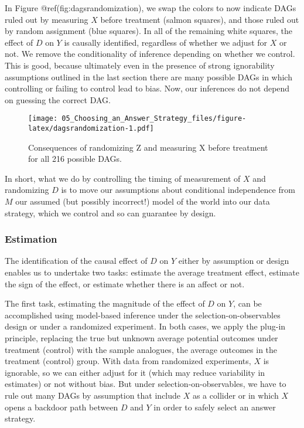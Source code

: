\documentclass[
]{article}
\begin{document}
In Figure @ref(fig:dagsrandomization), we swap the colors to now
indicate DAGs ruled out by measuring \(X\) before treatment (salmon
squares), and those ruled out by random assignment (blue squares). In
all of the remaining white squares, the effect of \(D\) on \(Y\) is
causally identified, regardless of whether we adjust for \(X\) or not.
We remove the conditionality of inference depending on whether we
control. This is good, because ultimately even in the presence of strong
ignorability assumptions outlined in the last section there are many
possible DAGs in which controlling or failing to control lead to bias.
Now, our inferences do not depend on guessing the correct DAG.

\begin{figure}
\centering
\texttt{[image: 05\_Choosing\_an\_Answer\_Strategy\_files/figure-latex/dagsrandomization-1.pdf]}
\caption{Consequences of randomizing Z and measuring X before treatment
for all 216 possible DAGs.}
\end{figure}

In short, what we do by controlling the timing of measurement of \(X\)
and randomizing \(D\) is to move our assumptions about conditional
independence from \(M\) our assumed (but possibly incorrect!) model of
the world into our data strategy, which we control and so can guarantee
by design.

\hypertarget{estimation}{%
\subsubsection{Estimation}\label{estimation}}

The identification of the causal effect of \(D\) on \(Y\) either by
assumption or design enables us to undertake two tasks: estimate the
average treatment effect, estimate the sign of the effect, or estimate
whether there is an affect or not.

The first task, estimating the magnitude of the effect of \(D\) on
\(Y\), can be accomplished using model-based inference under the
selection-on-observables design or under a randomized experiment. In
both cases, we apply the plug-in principle, replacing the true but
unknown average potential outcomes under treatment (control) with the
sample analogues, the average outcomes in the treatment (control) group.
With data from randomized experiments, \(X\) is ignorable, so we can
either adjust for it (which may reduce variability in estimates) or not
without bias. But under selection-on-observables, we have to rule out
many DAGs by assumption that include \(X\) as a collider or in which
\(X\) opens a backdoor path between \(D\) and \(Y\) in order to safely
select an answer strategy.
\end{document}
